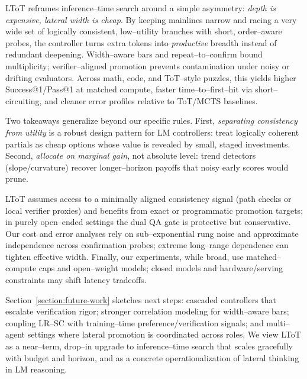 \documentclass{article}
\begin{document}
LToT reframes inference--time search around a simple asymmetry: \emph{depth is expensive, lateral width is cheap}.
By keeping mainlines narrow and racing a very wide set of logically consistent, low--utility branches with short, order--aware probes, the controller turns extra tokens into \emph{productive} breadth instead of redundant deepening.
Width--aware bars and repeat--to--confirm bound multiplicity; verifier--aligned promotion prevents contamination under noisy or drifting evaluators.
Across math, code, and ToT--style puzzles, this yields higher Success@1/Pass@1 at matched compute, faster time--to--first--hit via short--circuiting, and cleaner error profiles relative to ToT/MCTS baselines.

Two takeaways generalize beyond our specific rules.
First, \emph{separating consistency from utility} is a robust design pattern for LM controllers: treat logically coherent partials as cheap options whose value is revealed by small, staged investments.
Second, \emph{allocate on marginal gain}, not absolute level: trend detectors (slope/curvature) recover longer--horizon payoffs that noisy early scores would prune.

LToT assumes access to a minimally aligned consistency signal (path checks or local verifier proxies) and benefits from exact or programmatic promotion targets; in purely open--ended settings the dual QA gate is protective but conservative.
Our cost and error analyses rely on sub--exponential rung noise and approximate independence across confirmation probes; extreme long--range dependence can tighten effective width.
Finally, our experiments, while broad, use matched--compute caps and open--weight models; closed models and hardware/serving constraints may shift latency tradeoffs.

Section~\ref{section:future-work} sketches next steps: cascaded controllers that escalate verification rigor; stronger correlation modeling for width--aware bars; coupling LR--SC with training--time preference/verification signals; and multi--agent settings where lateral promotion is coordinated across roles.
We view LToT as a near--term, drop--in upgrade to inference--time search that scales gracefully with budget and horizon, and as a concrete operationalization of lateral thinking in LM reasoning.



\appendix
\end{document}
